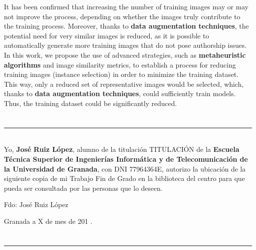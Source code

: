 It has been confirmed that increasing the number of training images may or may not improve the process, depending on
whether the images truly contribute to the training process.
Moreover, thanks to \textbf{data augmentation techniques}, the potential need for very similar images is reduced, as it
is possible to automatically generate more training images that do not pose authorship issues.\\[6pt]

In this work, we propose the use of advanced strategies, such as \textbf{metaheuristic algorithms} and image similarity
metrics, to establish a process for reducing training images (instance selection) in order to minimize the training
dataset.
This way, only a reduced set of representative images would be selected, which, thanks to \textbf{data augmentation
techniques}, could sufficiently train models.
Thus, the training dataset could be significantly reduced.\\[6pt]

\chapter*{}
\thispagestyle{empty}

\noindent\rule[-1ex]{\textwidth}{2pt}\\[4.5ex]

Yo, \textbf{José Ruiz López}, alumno de la titulación TITULACIÓN de la \textbf{Escuela Técnica Superior
de Ingenierías Informática y de Telecomunicación de la Universidad de Granada}, con DNI 77964364E, autorizo la
ubicación de la siguiente copia de mi Trabajo Fin de Grado en la biblioteca del centro para que pueda ser
consultada por las personas que lo deseen.

\vspace{6cm}

\noindent Fdo: José Ruiz López

\vspace{2cm}

\begin{flushright}
Granada a X de mes de 201 .
\end{flushright}


\chapter*{}
\thispagestyle{empty}

\noindent\rule[-1ex]{\textwidth}{2pt}\\[4.5ex]

